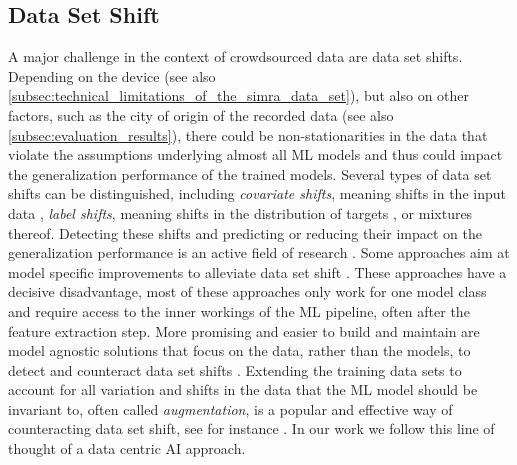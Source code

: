 \subsection{Data Set Shift}
\label{subsec:data_set_shift}
A major challenge in the context of crowdsourced data are data set shifts.
Depending on the device (see also \autoref{subsec:technical_limitations_of_the_simra_data_set}), but also on other factors, such as the city of origin of the recorded data (see also \autoref{subsec:evaluation_results}), there could be non-stationarities in the data that violate the assumptions underlying almost all ML models and thus could impact the generalization performance of the trained models.
Several types of data set shifts can be distinguished, including \textit{covariate shifts}, meaning shifts in the input data \cite{sugiyama_machine_2012}, \textit{label shifts}, meaning shifts in the distribution of targets \cite{lipton_detecting_2018}, or mixtures thereof.
Detecting these shifts \cite{polyzotis_data_2018, rabanser_failing_2018, breck_data_2019, abdar_review_2021, bates_testing_2021} and predicting \cite{schelter_learning_2020} or reducing their impact on the generalization performance is an active field of research \cite{schelter_challenges_2018, biessmann_automated_2021}.
Some approaches aim at model specific improvements to alleviate data set shift \cite{sugiyama_machine_2012}. These approaches have a decisive disadvantage, most of these approaches only work for one model class and require access to the inner workings of the ML pipeline, often after the feature extraction step.
More promising and easier to build and maintain are model agnostic solutions that focus on the data, rather than the models, to detect and counteract data set shifts \cite{biessmann_automated_2021}.
Extending the training data sets to account for all variation and shifts in the data that the ML model should be invariant to, often called \textit{augmentation}, is a popular and effective way of counteracting data set shift, see for instance \cite{cubuk_autoaugment_2019}.
In our work we follow this line of thought of a data centric AI approach. 



